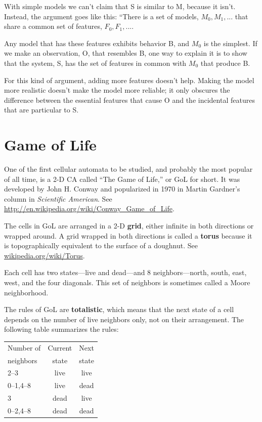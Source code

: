 \documentclass[10pt]{book}
\begin{document}
With simple models we can't claim that S is similar to M, because it
isn't.  Instead, the argument goes like this: ``There is a set of
models, ${M_0, M_1, ...}$ that share a common set of features, ${F_0,
  F_1, ...}$.

Any model that has these features exhibits behavior B, and $M_0$ is
the simplest.  If we make an observation, O, that resembles B, one way
to explain it is to show that the system, S, has the set of
features in common with $M_0$ that produce B.

For this kind of argument, adding more features doesn't help.  Making
the model more realistic doesn't make the model more reliable; it only
obscures the difference between the essential features that cause O
and the incidental features that are particular to S.


\chapter{Game of Life}
\label{life}

One of the first cellular automata to be studied, and probably the
most popular of all time, is a 2-D CA called ``The Game of Life,'' or GoL
for short.  It was developed by John H. Conway and popularized in 1970
in Martin Gardner's column in {\em Scientific American}.
See \url{http://en.wikipedia.org/wiki/Conway_Game_of_Life}.

The cells in GoL are arranged in a 2-D {\bf grid},
either infinite in both
directions or wrapped around.  A grid wrapped
in both directions is called a {\bf torus} because it is topographically
equivalent to the surface of a doughnut.
See \url{wikipedia.org/wiki/Torus}.

Each cell has two states---live and dead---and 8 neighbors---north,
south, east, west, and the four diagonals.  This set of neighbors
is sometimes called a Moore neighborhood.

The rules of GoL are {\bf totalistic}, which means that the next
state of a cell depends on the number of live neighbors only,
not on their arrangement.  The following table summarizes the
rules:

\begin{tabular}{|l|c|c|}
\hline
Number of     &   Current      & Next \\
neighbors     &   state        & state \\
\hline
2--3          &   live           & live         \\
0--1,4--8     &   live           & dead         \\
3             &   dead           & live         \\
0--2,4--8     &   dead           & dead         \\
\hline
\end{tabular}
\end{document}
